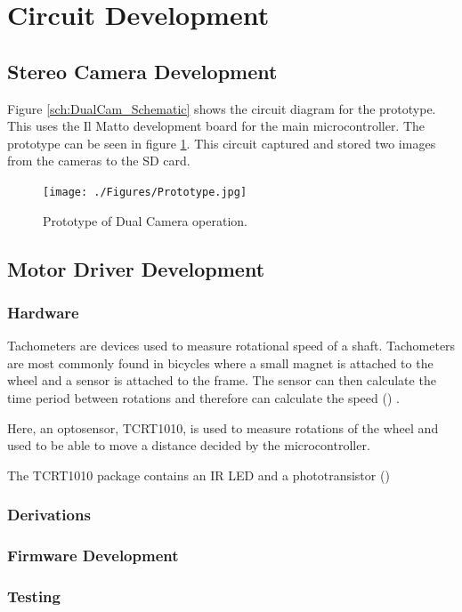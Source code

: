 \section{Circuit Development}
\subsection{Stereo Camera Development}
Figure \ref{sch:DualCam_Schematic} shows the circuit diagram for the prototype. This uses the Il Matto development board for the main microcontroller. The prototype can be seen in figure \ref{fig:Prototype}. This circuit captured and stored two images from the cameras to the SD card. 
\begin{figure}
\texttt{[image: ./Figures/Prototype.jpg]}
\caption{Prototype of Dual Camera operation.}
\label{fig:Prototype}
\end{figure}
\subsection{Motor Driver Development}
\subsubsection{Hardware}
Tachometers are devices used to measure rotational speed of a shaft. Tachometers are most commonly found in bicycles where a small magnet is attached to the wheel and a sensor is attached to the frame. The sensor can then calculate the time period between rotations and therefore can calculate the speed (\citep{NEEDED}) .

Here, an optosensor, TCRT1010, is used to measure rotations of the wheel and used to be able to move a distance decided by the microcontroller. 

The TCRT1010 package contains an IR LED and a phototransistor (\citep{Vishay:TCRT1010:Datasheet})

\subsubsection{Derivations}
\subsubsection{Firmware Development}
\subsubsection{Testing}



